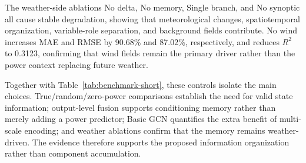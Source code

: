 The weather-side ablations No delta, No memory, Single branch, and No synoptic all cause stable degradation, showing that meteorological changes, spatiotemporal organization, variable-role separation, and background fields contribute. No wind increases MAE and RMSE by 90.68\% and 87.02\%, respectively, and reduces \(R^2\) to 0.3123, confirming that wind fields remain the primary driver rather than the power context replacing future weather.

Together with Table~\ref{tab:benchmark-short}, these controls isolate the main choices. True/random/zero-power comparisons establish the need for valid state information; output-level fusion supports conditioning memory rather than merely adding a power predictor; Basic GCN quantifies the extra benefit of multi-scale encoding; and weather ablations confirm that the memory remains weather-driven. The evidence therefore supports the proposed information organization rather than component accumulation.
